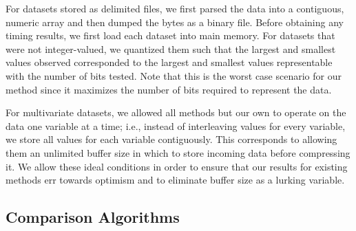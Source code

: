 
For datasets stored as delimited files, we first parsed the data into a contiguous, numeric array and then dumped the bytes as a binary file. Before obtaining any timing results, we first load each dataset into main memory.
For datasets that were not integer-valued, we quantized them such that the largest and smallest values observed corresponded to the largest and smallest values representable with the number of bits tested. Note that this is the worst case scenario for our method since it maximizes the number of bits required to represent the data.

For multivariate datasets, we allowed all methods but our own to operate on the data one variable at a time; i.e., instead of interleaving values for every variable, we store all values for each variable contiguously. This corresponds to allowing them an unlimited buffer size in which to store incoming data before compressing it. We allow these ideal conditions in order to ensure that our results for existing methods err towards optimism and to eliminate buffer size as a lurking variable.


\subsection{Comparison Algorithms}

